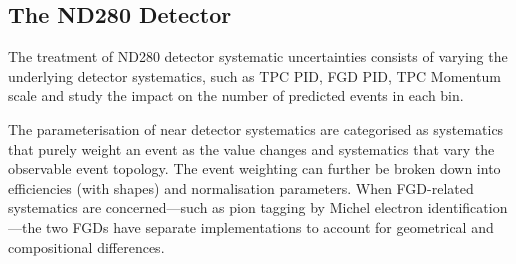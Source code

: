 \subsection{The ND280 Detector}
\label{subsec:syst_nd280}
The treatment of ND280 detector systematic uncertainties consists of varying the underlying detector systematics, such as TPC PID, FGD PID, TPC Momentum scale and study the impact on the number of predicted events in each \pmu \cosmu bin. 

The parameterisation of near detector systematics are categorised as systematics that purely weight an event as the value changes and systematics that vary the observable event topology. The event weighting can further be broken down into efficiencies (with shapes) and normalisation parameters. When FGD-related systematics are concerned---such as pion tagging by Michel electron identification---the two FGDs have separate implementations to account for geometrical and compositional differences.

